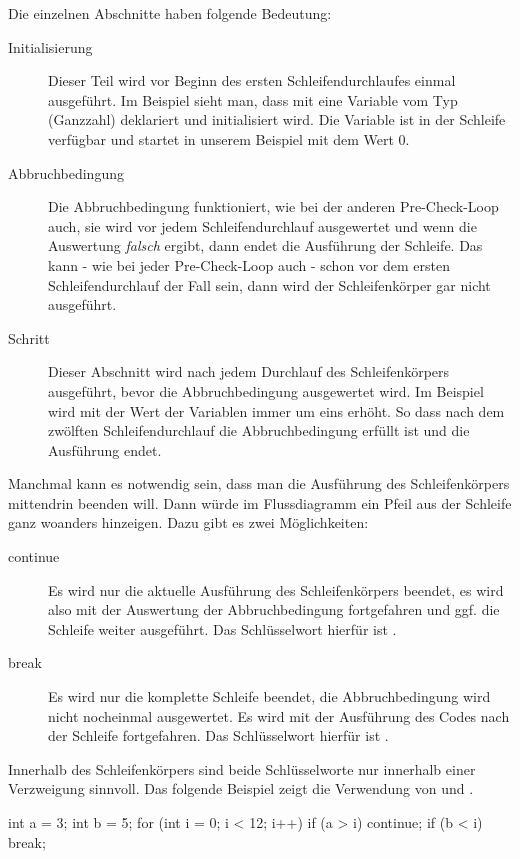 Die einzelnen Abschnitte haben folgende Bedeutung:
\begin{description}
	\item[Initialisierung] Dieser Teil wird vor Beginn des ersten Schleifendurchlaufes einmal ausgeführt. 
	Im Beispiel sieht man, dass mit  eine Variable vom Typ  (Ganzzahl) deklariert und
	initialisiert wird. Die Variable  ist in der Schleife verfügbar und startet in unserem Beispiel mit dem
	Wert 0.
	\item[Abbruchbedingung] Die Abbruchbedingung funktioniert, wie bei der anderen Pre-Check-Loop auch, sie wird vor jedem
	Schleifendurchlauf ausgewertet und wenn die Auswertung \emph{falsch} ergibt, dann endet die Ausführung der Schleife. 
	Das kann - wie bei jeder Pre-Check-Loop auch - schon vor dem ersten Schleifendurchlauf der Fall sein, dann wird der 
	Schleifenkörper gar nicht ausgeführt.
	\item[Schritt] Dieser Abschnitt wird nach jedem Durchlauf des Schleifenkörpers ausgeführt, bevor die Abbruchbedingung
	ausgewertet wird. Im Beispiel wird mit  der Wert der Variablen  immer um eins erhöht. So dass nach dem zwölften
	Schleifendurchlauf die Abbruchbedingung erfüllt ist und die Ausführung endet.
\end{description}
\vfill\null\columnbreak
{}
Manchmal kann es notwendig sein, dass man die Ausführung des Schleifenkörpers mittendrin beenden will. Dann würde im Flussdiagramm ein
Pfeil aus der Schleife ganz woanders hinzeigen. Dazu gibt es zwei Möglichkeiten:
\begin{description}
  \item[continue] Es wird nur die aktuelle Ausführung des Schleifenkörpers beendet, es wird also mit der Auswertung der Abbruchbedingung
	fortgefahren und ggf. die Schleife weiter ausgeführt. Das Schlüsselwort hierfür ist .
  \item[break] Es wird nur die komplette Schleife beendet, die Abbruchbedingung wird nicht nocheinmal ausgewertet.
	Es wird mit der Ausführung des Codes nach der Schleife fortgefahren. Das Schlüsselwort hierfür ist .	
\end{description}

Innerhalb des Schleifenkörpers sind beide Schlüsselworte nur innerhalb einer Verzweigung sinnvoll.
Das folgende Beispiel zeigt die Verwendung von  und .

\begin{src}
int a = 3;
int b = 5;
for (int i = 0; i < 12; i++)
{
  if (a > i)
  { 
    continue; 
  }
  if (b < i)
  { 
    break;
  }
}
\end{src}

